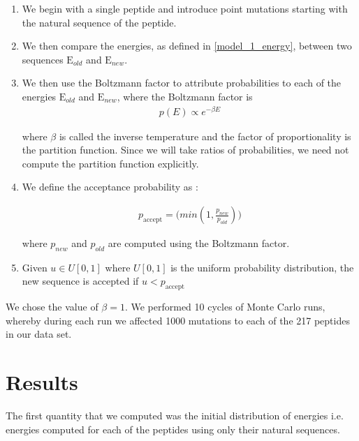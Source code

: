 \documentclass[a4paper, 12pt]{article}
\begin{document}
	\begin{enumerate}
	\item 
	We begin with a single peptide and introduce point mutations starting with the natural sequence of the peptide. 
	\item 
	We then compare the energies, as defined in \eqref{model_1_energy}, between two sequences $\mathrm{E}_{old}$ and $\mathrm{E}_{new}$. 
	\item 
	We then use the Boltzmann factor to attribute probabilities to each of the energies  $\mathrm{E}_{old}$ and $\mathrm{E}_{new}$, where the Boltzmann factor is 
	\begin{align}
	\label{boltz}
	p(E) \propto e^{-\beta E}
	\end{align}

	where $\beta$ is called the inverse temperature and the factor of proportionality is the partition function. Since we will take ratios of probabilities, we need not compute the partition function explicitly. 

	\item 
	We define the acceptance probability as :

	\begin{align}
	\label{prob_acceptance}
	p_{\mathrm{accept}} = \mathrm(min(1, \frac{p_{new}}{p_{old}}))
	\end{align}

	where $p_{new}$ and $p_{old}$ are computed using the Boltzmann factor.

	\item 

	Given $u \in U[0,1]$ where $U[0,1]$ is the uniform probability distribution, the new sequence is accepted if $ u < p_{\mathrm{accept}}$
	\end{enumerate}

	We chose the value of $\beta=1$. We performed 10 cycles of Monte Carlo runs, whereby during each run we affected 1000 mutations to each of the 217 peptides in our data set. 

 	\section{Results}

 	The first quantity that we computed was the initial distribution of energies i.e. energies computed for each of the peptides using only their natural sequences. 
\end{document}
